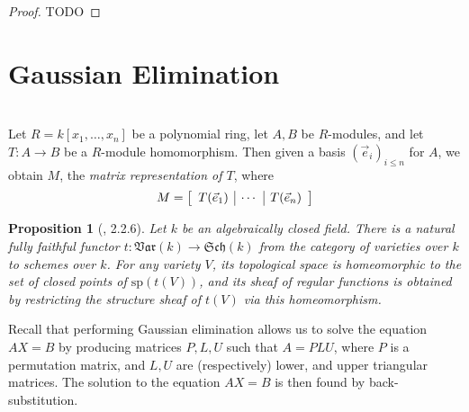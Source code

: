 \documentclass{amsart}
\newtheorem{proposition}[theorem]{Proposition}
\theoremstyle{definition}
\theoremstyle{remark}
\numberwithin{equation}{section}
\begin{document}
\begin{proof}
  TODO
\end{proof}



\section{Gaussian Elimination}

\begin{aroundtodo}[prepend, caption={\textbf{Alternative Approach}}, color=green!40]
  \leavevmode\\
  Let $R = k[x_1, \ldots, x_n]$ be a polynomial ring, let $A, B$ be $R$-modules, and let $T: A \to B$ be a $R$-module homomorphism. Then given a basis $(\vec{e}_i)_{i \leq n}$ for $A$, we obtain $M$, the \emph{matrix representation of $T$}, where
  \begin{equation*}
    M = \left[
      \begin{array}{c | c | c}
        T(\vec{e}_1) & \cdots & T(\vec{e}_n)
      \end{array}
      \right]
  \end{equation*}
  \begin{proposition}[\cite{MR0463157}, 2.2.6]
    Let $k$ be an algebraically closed field. There is a natural fully faithful functor $t: \mathfrak{Var}(k) \to \mathfrak{Sch}(k)$ from the category of varieties over $k$ to schemes over $k$. For any variety $V$, its topological space is homeomorphic to the set of closed points of $\mathrm{sp}(t(V))$, and its sheaf of regular functions is obtained by restricting the structure sheaf of $t(V)$ via this homeomorphism.
  \end{proposition}
\end{aroundtodo}

Recall that performing Gaussian elimination allows us to solve the equation $AX = B$ by producing matrices $P, L, U$ such that $A = PLU$, where $P$ is a permutation matrix, and $L, U$ are (respectively) lower, and upper triangular matrices. The solution to the equation $AX = B$ is then found by back-substitution.
\end{document}
